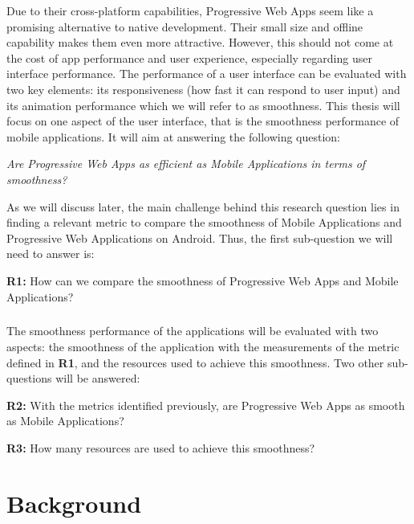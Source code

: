 \documentclass{kththesis}
\begin{document}
Due to their cross-platform capabilities, Progressive Web Apps seem like a promising alternative to native development. Their small size and offline capability makes them even more attractive. However, this should not come at the cost of app performance and user experience, especially regarding user interface performance. The performance of a user interface can be evaluated with two key elements: its responsiveness (how fast it can respond to user input) and its animation performance which we will refer to as smoothness. 
This thesis will focus on one aspect of the user interface, that is the smoothness performance of mobile applications. It will aim at answering the following question: 
\begin{center}
    \textit{Are Progressive Web Apps as efficient as Mobile Applications in terms of smoothness?}
\end{center}
As we will discuss later, the main challenge behind this research question lies in finding a relevant metric to compare the smoothness of Mobile Applications and Progressive Web Applications on Android. Thus, the first sub-question we will need to answer is: \newline

\textbf{R1:} How can we compare the smoothness of Progressive Web Apps and Mobile Applications?

\paragraph{}
The smoothness performance of the applications will be evaluated with two aspects: the smoothness of the application with the measurements of the metric defined in \textbf{R1}, and the resources used to achieve this smoothness. Two other sub-questions will be answered: \newline

\textbf{R2:} With the metrics identified previously, are Progressive Web Apps as smooth as Mobile Applications? \newline

\medskip

\textbf{R3:} How many resources are used to achieve this smoothness?
\fi



\chapter{Background}
\end{document}
